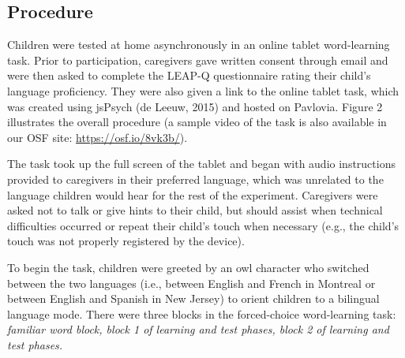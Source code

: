 \documentclass[
  man,floatsintext]{apa7}
\begin{document}
\hypertarget{procedure}{%
\subsection{Procedure}\label{procedure}}

Children were tested at home asynchronously in an online tablet word-learning task. Prior to participation, caregivers gave written consent through email and were then asked to complete the LEAP-Q questionnaire rating their child's language proficiency. They were also given a link to the online tablet task, which was created using jsPsych (de Leeuw, 2015) and hosted on Pavlovia. Figure 2 illustrates the overall procedure (a sample video of the task is also available in our OSF site: \url{https://osf.io/8vk3b/}).

The task took up the full screen of the tablet and began with audio instructions provided to caregivers in their preferred language, which was unrelated to the language children would hear for the rest of the experiment. Caregivers were asked not to talk or give hints to their child, but should assist when technical difficulties occurred or repeat their child's touch when necessary (e.g., the child's touch was not properly registered by the device).

To begin the task, children were greeted by an owl character who switched between the two languages (i.e., between English and French in Montreal or between English and Spanish in New Jersey) to orient children to a bilingual language mode. There were three blocks in the forced-choice word-learning task: \emph{familiar word block, block 1 of learning and test phases, block 2 of learning and test phases.}
\end{document}
